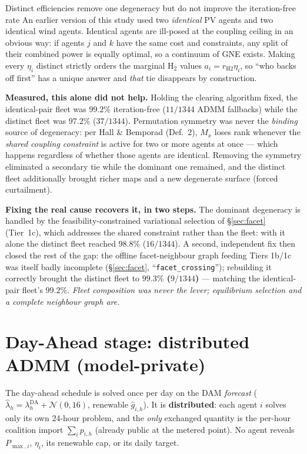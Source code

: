 \documentclass[11pt, letterpaper]{article}
\begin{document}
\begin{warnbox}{Distinct efficiencies remove one degeneracy but do not improve the iteration-free rate}
An earlier version of this study used two \emph{identical} PV agents and two identical wind agents.
Identical agents are ill-posed at the coupling ceiling in an obvious way: if agents $j$ and $k$ have
the same cost and constraints, any split of their combined power is equally optimal, so a continuum
of GNE exists. Making every $\eta_i$ distinct strictly orders the marginal H$_2$ values
$a_i=r_{\mathrm{H2}}\eta_i$, so ``who backs off first'' has a unique answer and \emph{that}
tie disappears by construction.

\textbf{Measured, this alone did not help.} Holding the clearing algorithm fixed, the
identical-pair fleet was $99.2\%$ iteration-free ($11/1344$ ADMM fallbacks) while the distinct
fleet was $97.2\%$ ($37/1344$). Permutation symmetry was never the \emph{binding} source of
degeneracy: per Hall \& Bemporad (Def.~2), $M_x$ loses rank whenever the \emph{shared coupling
constraint} is active for two or more agents at once --- which happens regardless of whether those
agents are identical. Removing the symmetry eliminated a secondary tie while the dominant one
remained, and the distinct fleet additionally brought richer maps and a new degenerate surface
(forced curtailment).

\textbf{Fixing the real cause recovers it, in two steps.} The dominant degeneracy is handled by the
feasibility-constrained variational selection of \S\ref{sec:facet} (Tier~1c), which addresses the
shared constraint rather than the fleet: with it alone the distinct fleet reached $98.8\%$
($16/1344$). A second, independent fix then closed the rest of the gap: the offline
facet-neighbour graph feeding Tiers 1b/1c was itself badly incomplete (\S\ref{sec:facet},
``\texttt{facet\_crossing}''); rebuilding it correctly brought the distinct fleet to
\textbf{$99.3\%$ ($9/1344$)} --- matching the identical-pair fleet's $99.2\%$. \emph{Fleet
composition was never the lever; equilibrium selection and a complete neighbour graph are.}
\end{warnbox}

\section{Day-Ahead stage: distributed ADMM (model-private)}\label{sec:dam}
The day-ahead schedule is solved once per day on the DAM \emph{forecast}
($\hat\lambda_h=\lambda^{\mathrm{DA}}_h+\mathcal N(0,16)$, renewable $\hat g_{i,h}$). It is
\textbf{distributed}: each agent $i$ solves only its own 24-hour problem, and the \emph{only}
exchanged quantity is the per-hour coalition import $\sum_i p_{i,h}$ (already public at the metered
point). No agent reveals $P_{\max,i}$, $\eta_i$, its renewable cap, or its daily target.
\end{document}

